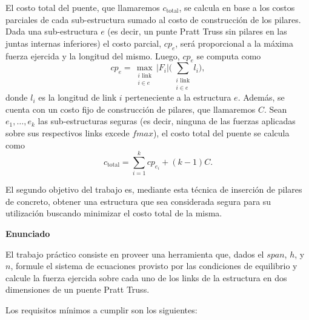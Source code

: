 El costo total del puente, que llamaremos $c_{\textrm{total}}$, se calcula en base a los costos parciales de cada sub-estructura
sumado al costo de construcci\'on de los pilares. Dada una sub-estructura $e$ (es decir, un punte Pratt Truss sin pilares
en las juntas internas inferiores) el costo parcial, $cp_e$, ser\'a proporcional a la m\'axima fuerza ejercida y la longitud del
mismo. Luego, $cp_e$ se computa como 
\begin{displaymath}
cp_e = \max_{\substack{i \textrm{ link}\\ i\in e}}|F_i|\Bigg(\sum_{\substack{i \textrm{ link}\\ i\in e}} l_i\Bigg),
\end{displaymath}
donde $l_i$ es la longitud de link $i$ perteneciente a la estructura $e$. Adem\'as, se cuenta con un costo fijo de
construcci\'on de pilares, que llamaremos $C$. Sean $e_1,\dots,e_k$ las sub-estructuras seguras (es decir, ninguna de
las fuerzas aplicadas sobre sus respectivos links excede $fmax$), el costo total del puente se calcula como
\begin{displaymath}
c_{\textrm{total}} = \sum_{i = 1}^k cp_{e_i} + (k-1)C.
\end{displaymath}

El segundo objetivo del trabajo es, mediante esta t\'ecnica de inserci\'on de pilares de concreto, obtener una
estructura que sea considerada segura para su utilizaci\'on buscando minimizar el costo total de la misma.

\textbf{Enunciado}

El trabajo pr\'actico consiste en proveer una herramienta que, dados el $span$, $h$, y $n$, formule el sistema de
ecuaciones provisto por las condiciones de equilibrio y calcule la fuerza ejercida sobre cada uno de los links de la
estructura en dos dimensiones de un puente Pratt Truss.

Los requisitos m\'inimos a cumplir son los siguientes:

